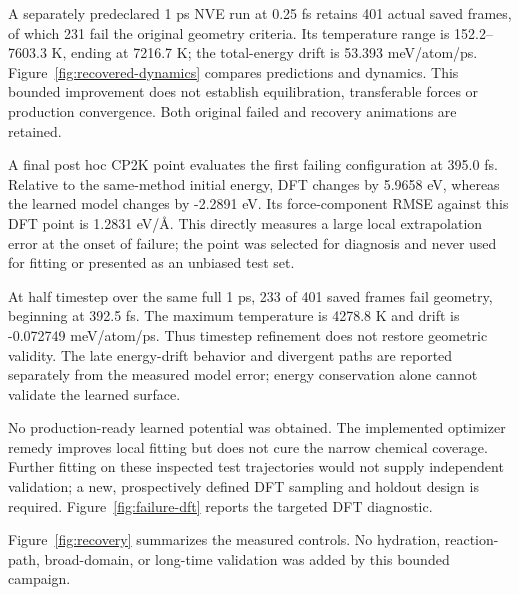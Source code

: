 A separately predeclared 1 ps NVE run at 0.25 fs retains 401 actual saved frames, of which 231 fail the original geometry criteria. Its temperature range is 152.2--7603.3 K, ending at 7216.7 K; the total-energy drift is 53.393 meV/atom/ps. Figure~\ref{fig:recovered-dynamics} compares predictions and dynamics. This bounded improvement does not establish equilibration, transferable forces or production convergence. Both original failed and recovery animations are retained.

A final post hoc CP2K point evaluates the first failing configuration at 395.0 fs. Relative to the same-method initial energy, DFT changes by 5.9658 eV, whereas the learned model changes by -2.2891 eV. Its force-component RMSE against this DFT point is 1.2831 eV/\AA. This directly measures a large local extrapolation error at the onset of failure; the point was selected for diagnosis and never used for fitting or presented as an unbiased test set.

At half timestep over the same full 1 ps, 233 of 401 saved frames fail geometry, beginning at 392.5 fs. The maximum temperature is 4278.8 K and drift is -0.072749 meV/atom/ps. Thus timestep refinement does not restore geometric validity. The late energy-drift behavior and divergent paths are reported separately from the measured model error; energy conservation alone cannot validate the learned surface.

No production-ready learned potential was obtained. The implemented optimizer remedy improves local fitting but does not cure the narrow chemical coverage. Further fitting on these inspected test trajectories would not supply independent validation; a new, prospectively defined DFT sampling and holdout design is required. Figure~\ref{fig:failure-dft} reports the targeted DFT diagnostic.

Figure~\ref{fig:recovery} summarizes the measured controls. No hydration, reaction-path, broad-domain, or long-time validation was added by this bounded campaign.
